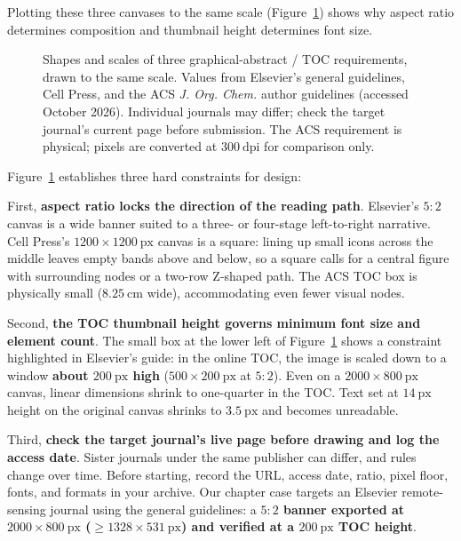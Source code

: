 Plotting these three canvases to the same scale (Figure~\ref{fig:ch10-01}) shows why aspect ratio determines composition and thumbnail height determines font size.

\begin{figure}[htbp]\centering
\resizebox{\linewidth}{!}{}
\caption{Shapes and scales of three graphical-abstract / TOC requirements, drawn to the same scale. Values from Elsevier's general guidelines, Cell Press, and the ACS \textit{J. Org. Chem.} author guidelines (accessed October 2026). Individual journals may differ; check the target journal's current page before submission. The ACS requirement is physical; pixels are converted at $300\ \text{dpi}$ for comparison only.}\label{fig:ch10-01}
\end{figure}

Figure~\ref{fig:ch10-01} establishes three hard constraints for design:

First, \textbf{aspect ratio locks the direction of the reading path}. Elsevier's $5:2$ canvas is a wide banner suited to a three- or four-stage left-to-right narrative. Cell Press's $1200 \times 1200\ \text{px}$ canvas is a square: lining up small icons across the middle leaves empty bands above and below, so a square calls for a central figure with surrounding nodes or a two-row Z-shaped path. The ACS TOC box is physically small ($8.25\ \text{cm}$ wide), accommodating even fewer visual nodes.

Second, \textbf{the TOC thumbnail height governs minimum font size and element count}. The small box at the lower left of Figure~\ref{fig:ch10-01} shows a constraint highlighted in Elsevier's guide: in the online TOC, the image is scaled down to a window \textbf{about $200\ \text{px}$ high} ($500 \times 200\ \text{px}$ at $5:2$). Even on a $2000 \times 800\ \text{px}$ canvas, linear dimensions shrink to one-quarter in the TOC. Text set at $14\ \text{px}$ height on the original canvas shrinks to $3.5\ \text{px}$ and becomes unreadable.

Third, \textbf{check the target journal's live page before drawing and log the access date}. Sister journals under the same publisher can differ, and rules change over time. Before starting, record the URL, access date, ratio, pixel floor, fonts, and formats in your archive. Our chapter case targets an Elsevier remote-sensing journal using the general guidelines: a \textbf{$5:2$ banner exported at $2000 \times 800\ \text{px}$ ($\ge 1328 \times 531\ \text{px}$) and verified at a $200\ \text{px}$ TOC height}.

